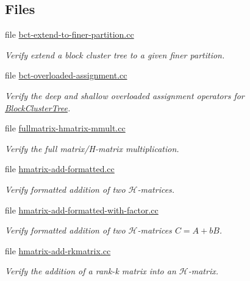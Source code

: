 \subsection*{Files}
\begin{DoxyCompactItemize}
\item 
file \hyperlink{bct-extend-to-finer-partition_8cc}{bct-\/extend-\/to-\/finer-\/partition.\+cc}
\begin{DoxyCompactList}\small\item\em Verify extend a block cluster tree to a given finer partition. \end{DoxyCompactList}\item 
file \hyperlink{bct-overloaded-assignment_8cc}{bct-\/overloaded-\/assignment.\+cc}
\begin{DoxyCompactList}\small\item\em Verify the deep and shallow overloaded assignment operators for {\ttfamily \hyperlink{classBlockClusterTree}{Block\+Cluster\+Tree}}. \end{DoxyCompactList}\item 
file \hyperlink{fullmatrix-hmatrix-mmult_8cc}{fullmatrix-\/hmatrix-\/mmult.\+cc}
\begin{DoxyCompactList}\small\item\em Verify the full matrix/\+H-\/matrix multiplication. \end{DoxyCompactList}\item 
file \hyperlink{hmatrix-add-formatted_8cc}{hmatrix-\/add-\/formatted.\+cc}
\begin{DoxyCompactList}\small\item\em Verify formatted addition of two $\mathcal{H}$-\/matrices. \end{DoxyCompactList}\item 
file \hyperlink{hmatrix-add-formatted-with-factor_8cc}{hmatrix-\/add-\/formatted-\/with-\/factor.\+cc}
\begin{DoxyCompactList}\small\item\em Verify formatted addition of two $\mathcal{H}$-\/matrices $C = A + b B$. \end{DoxyCompactList}\item 
file \hyperlink{hmatrix-add-rkmatrix_8cc}{hmatrix-\/add-\/rkmatrix.\+cc}
\begin{DoxyCompactList}\small\item\em Verify the addition of a rank-\/k matrix into an $\mathcal{H}$-\/matrix. \end{DoxyCompactList}\item 

\end{DoxyCompactItemize}
